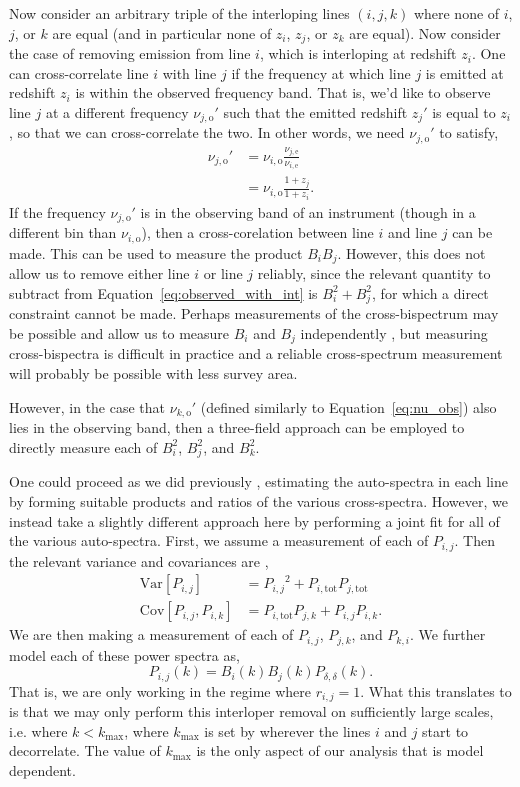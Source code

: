 \documentclass{aastex62}
\newcommand{\beq}{\begin{equation}}
\newcommand{\eeq}{\end{equation}}
\newcommand{\mynu}[2]{\ensuremath{\nu_{#1,\text{#2}}}}
\newcommand{\denps}{\ensuremath{P_{\delta,\delta}}}
\newcommand{\xps}[2]{\ensuremath{P_{#1,#2}}}
\newcommand{\pstot}[1]{\ensuremath{P_{#1,\text{tot}}}}
\newcommand{\Var}[1]{\mathrm{Var}[#1]}
\newcommand{\Cov}[2]{\mathrm{Cov}[#1,#2]}
\begin{document}
Now consider an arbitrary triple of the interloping lines $(i, j, k)$ where
none of $i$, $j$, or $k$ are equal (and in particular none of $z_i$, $z_j$, or
$z_k$ are equal). Now consider the case of removing emission from line $i$,
which is interloping at redshift $z_i$. One can cross-correlate line $i$ with
line $j$ if the frequency at which line $j$ is emitted at redshift $z_i$ is
within the observed frequency band. That is, we'd like to observe line $j$ at
a different frequency $\mynu{j}{o}'$ such that the emitted redshift $z_j'$ is
equal to $z_i$, so that we can cross-correlate the two. In other words, we
need $\mynu{j}{o}'$ to satisfy,
\beq\label{eq:nu_obs}
\begin{split}
\mynu{j}{o}' &= \mynu{i}{o} \frac{\mynu{j}{e}}{\mynu{i}{e}} \\
&= \mynu{i}{o} \frac{1+z_j}{1+z_i}\text{.}
\end{split}
\eeq
If the frequency $\mynu{j}{o}'$ is in the observing band of an instrument
(though in a different bin than $\mynu{i}{o}$), then a cross-corelation
between line $i$ and line $j$ can be made. This can be used to measure the
product $B_iB_j$. However, this does not allow us to remove either line $i$ or
line $j$ reliably, since the relevant quantity to subtract from
Equation~\ref{eq:observed_with_int} is $B_i^2 + B_j^2$, for which a direct
constraint cannot be made. Perhaps measurements of the cross-bispectrum may be
possible and allow us to measure $B_i$ and $B_j$ independently
\citep{2018ApJ...867...26B}, but measuring cross-bispectra is difficult in
practice and a reliable cross-spectrum measurement will probably be possible
with less survey area.

However, in the case that $\mynu{k}{o}'$ (defined similarly to
Equation~\ref{eq:nu_obs}) also lies in the observing band, then a three-field
approach can be employed to directly measure each of $B_i^2$, $B_j^2$, and
$B_k^2$.

One could proceed as we did previously \citep{2018arXiv181110609B}, estimating
the auto-spectra in each line by forming suitable products and ratios of the
various cross-spectra. However, we instead take a slightly different approach
here by performing a joint fit for all of the various auto-spectra. First, we
assume a measurement of each of $\xps{i}{j}$. Then the relevant variance and
covariances are \citep[e.g.][]{2015JCAP...03..034V},
\beq
\begin{split}
\Var{\xps{i}{j}} &= \xps{i}{j}^2 + \pstot{i}\pstot{j} \\
\Cov{\xps{i}{j}}{\xps{i}{k}} &= \pstot{i}\xps{j}{k} + \xps{i}{j}\xps{i}{k}\text{.}
\end{split}
\eeq
We are then making a measurement of each of $\xps{i}{j}$, $\xps{j}{k}$,
and $\xps{k}{i}$. We further model each of these power spectra as,
\beq
\xps{i}{j}(k) = B_i(k) B_j(k) \denps(k)\text{.}
\eeq
That is, we are only working in the regime where $r_{i,j}=1$. What this
translates to is that we may only perform this interloper removal on
sufficiently large scales, i.e. where $k<k_{\text{max}}$, where
$k_{\text{max}}$ is set by wherever the lines $i$ and $j$ start to
decorrelate. The value of $k_{\text{max}}$ is the only aspect of our analysis
that is model dependent. 




\end{document}
